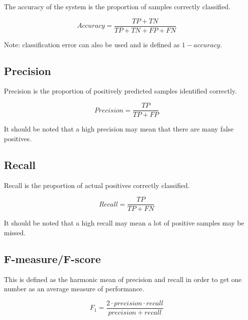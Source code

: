 The accuracy of the system is the proportion of samples correctly classified.

$$ Accuracy = \frac{TP + TN}{TP + TN + FP + FN} $$

Note: classification error can also be used and is defined as $ 1 - accuracy $.

\subsection{Precision}

Precision is the proportion of positively predicted samples identified correctly.

$$ Precision = \frac{TP}{TP + FP} $$

It should be noted that a high precision may mean that there are many false positives.

\subsection{Recall}

Recall is the proportion of actual positives correctly classified.

$$ Recall = \frac{TP}{TP + FN} $$

It should be noted that a high recall may mean a lot of positive samples may be missed.

\subsection{F-measure/F-score}

This is defined as the harmonic mean of precision and recall in order to get one number as an average measure of performance.

$$ F_1 = \frac{2 \cdot precision \cdot recall}{precision + recall} $$